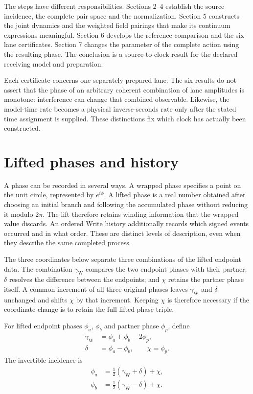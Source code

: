 \documentclass[10pt,twocolumn,letterpaper]{article}
\begin{document}
The steps have different responsibilities. Sections 2--4 establish the source incidence, the complete pair space and the normalization. Section 5 constructs the joint dynamics and the weighted field pairings that make its continuum expressions meaningful. Section 6 develops the reference comparison and the six lane certificates. Section 7 changes the parameter of the complete action using the resulting phase. The conclusion is a source-to-clock result for the declared receiving model and preparation.

Each certificate concerns one separately prepared lane. The six results do not assert that the phase of an arbitrary coherent combination of lane amplitudes is monotone: interference can change that combined observable. Likewise, the model-time rate becomes a physical inverse-seconds rate only after the stated time assignment is supplied. These distinctions fix which clock has actually been constructed.

\section{Lifted phases and history}


A phase can be recorded in several ways. A wrapped phase specifies a point on the unit circle, represented by $e^{i\phi}$. A lifted phase is a real number obtained after choosing an initial branch and following the accumulated phase without reducing it modulo $2\pi$. The lift therefore retains winding information that the wrapped value discards. An ordered Write history additionally records which signed events occurred and in what order. These are distinct levels of description, even when they describe the same completed process.

The three coordinates below separate three combinations of the lifted endpoint data. The combination $\gamma_{\mathrm W}$ compares the two endpoint phases with their partner; $\delta$ resolves the difference between the endpoints; and $\chi$ retains the partner phase itself. A common increment of all three original phases leaves $\gamma_{\mathrm W}$ and $\delta$ unchanged and shifts $\chi$ by that increment. Keeping $\chi$ is therefore necessary if the coordinate change is to retain the full lifted phase triple.

For lifted endpoint phases $\phi_a$, $\phi_b$ and partner phase $\phi_p$, define
\begin{equation}
\begin{aligned}
\gamma_{\mathrm{W}}&=\phi_a+\phi_b-2\phi_p,\\
\delta&=\phi_a-\phi_b,\qquad \chi=\phi_p.
\end{aligned}
\tag{1}
\end{equation}
The invertible incidence is
\begin{equation}
\begin{aligned}
\phi_a&=\frac{1}{2}(\gamma_{\mathrm{W}}+\delta)+\chi,\\
\phi_b&=\frac{1}{2}(\gamma_{\mathrm{W}}-\delta)+\chi.
\end{aligned}
\tag{2}
\end{equation}
\end{document}
